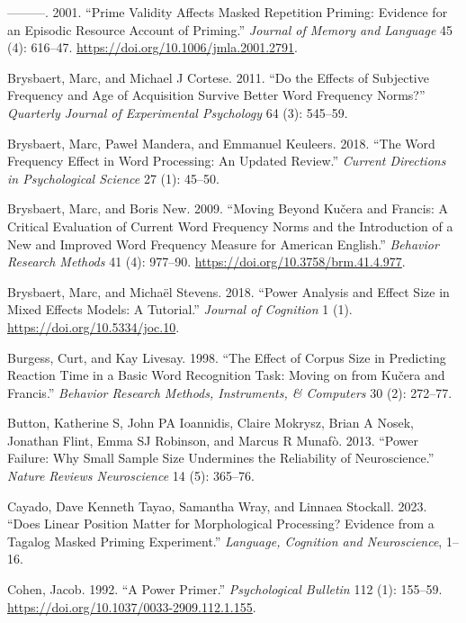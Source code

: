 \documentclass[
]{interact}
\newlength{\cslhangindent}
\newenvironment{CSLReferences}[2] %
 {\begin{list}{}{%
  \setlength{\itemindent}{0pt}
  \setlength{\leftmargin}{0pt}
  \setlength{\parsep}{0pt}
  \ifodd #1
   \setlength{\leftmargin}{\cslhangindent}
   \setlength{\itemindent}{-1\cslhangindent}
  \fi
  \setlength{\itemsep}{#2\baselineskip}}}
 {\end{list}}
\begin{document}
\begin{CSLReferences}{1}{0}
---------. 2001. {``Prime Validity Affects Masked Repetition Priming:
Evidence for an Episodic Resource Account of Priming.''} \emph{Journal
of Memory and Language} 45 (4): 616--47.
\url{https://doi.org/10.1006/jmla.2001.2791}.

Brysbaert, Marc, and Michael J Cortese. 2011. {``Do the Effects of
Subjective Frequency and Age of Acquisition Survive Better Word
Frequency Norms?''} \emph{Quarterly Journal of Experimental Psychology}
64 (3): 545--59.

Brysbaert, Marc, Paweł Mandera, and Emmanuel Keuleers. 2018. {``The Word
Frequency Effect in Word Processing: An Updated Review.''} \emph{Current
Directions in Psychological Science} 27 (1): 45--50.

Brysbaert, Marc, and Boris New. 2009. {``Moving Beyond Ku{č}era and
Francis: A Critical Evaluation of Current Word Frequency Norms and the
Introduction of a New and Improved Word Frequency Measure for American
English.''} \emph{Behavior Research Methods} 41 (4): 977--90.
\url{https://doi.org/10.3758/brm.41.4.977}.

Brysbaert, Marc, and Michaël Stevens. 2018. {``Power Analysis and Effect
Size in Mixed Effects Models: A Tutorial.''} \emph{Journal of Cognition}
1 (1). \url{https://doi.org/10.5334/joc.10}.

Burgess, Curt, and Kay Livesay. 1998. {``The Effect of Corpus Size in
Predicting Reaction Time in a Basic Word Recognition Task: Moving on
from Ku{č}era and Francis.''} \emph{Behavior Research Methods,
Instruments, \& Computers} 30 (2): 272--77.

Button, Katherine S, John PA Ioannidis, Claire Mokrysz, Brian A Nosek,
Jonathan Flint, Emma SJ Robinson, and Marcus R Munafò. 2013. {``Power
Failure: Why Small Sample Size Undermines the Reliability of
Neuroscience.''} \emph{Nature Reviews Neuroscience} 14 (5): 365--76.

Cayado, Dave Kenneth Tayao, Samantha Wray, and Linnaea Stockall. 2023.
{``Does Linear Position Matter for Morphological Processing? Evidence
from a Tagalog Masked Priming Experiment.''} \emph{Language, Cognition
and Neuroscience}, 1--16.

Cohen, Jacob. 1992. {``A Power Primer.''} \emph{Psychological Bulletin}
112 (1): 155--59. \url{https://doi.org/10.1037/0033-2909.112.1.155}.


\end{CSLReferences}
\end{document}
